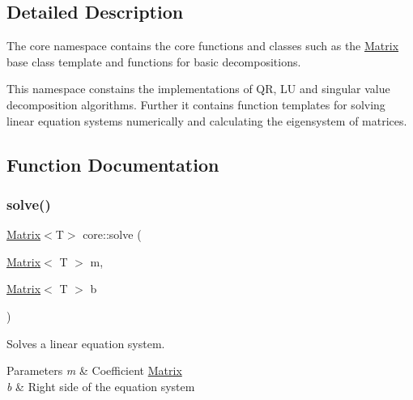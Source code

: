 \subsection{Detailed Description}
The core namespace contains the core functions and classes such as the \mbox{\hyperlink{classcore_1_1_matrix}{Matrix}} base class template and functions for basic decompositions. 

This namespace constains the implementations of QR, LU and singular value decomposition algorithms. Further it contains function templates for solving linear equation systems numerically and calculating the eigensystem of matrices. 

\subsection{Function Documentation}
\mbox{\label{namespacecore_a8e026b46f671dd953967abc95887e364}} 
\subsubsection{\texorpdfstring{solve()}{solve()}}
{\footnotesize\ttfamily \mbox{\hyperlink{classcore_1_1_matrix}{Matrix}}$<$T$>$ core\+::solve (\begin{DoxyParamCaption}\item[{\mbox{\hyperlink{classcore_1_1_matrix}{Matrix}}$<$ T $>$}]{m,  }\item[{\mbox{\hyperlink{classcore_1_1_matrix}{Matrix}}$<$ T $>$}]{b }\end{DoxyParamCaption})}



Solves a linear equation system. 


\begin{DoxyParams}{Parameters}
{\em m} & Coefficient \mbox{\hyperlink{classcore_1_1_matrix}{Matrix}} \\
\hline
{\em b} & Right side of the equation system \\
\hline
\end{DoxyParams}
